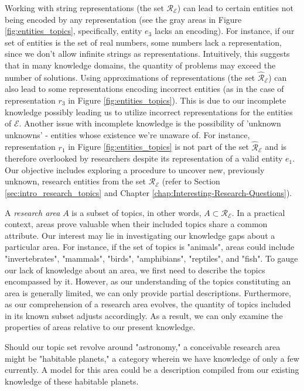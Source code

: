 Working with string representations (the set $\mathcal{R}_\mathcal{E}$) can lead to certain entities not being encoded by any representation (see the gray areas in Figure \ref{fig:entities_topics}, specifically, entity $e_3$ lacks an encoding). For instance, if our set of entities is the set of real numbers, some numbers lack a representation, since we don't allow infinite strings as representations. Intuitively, this suggests that in many knowledge domains, the quantity of problems may exceed the number of solutions. Using approximations of representations (the set $\hat{\mathcal{R}}_\mathcal{E}$) can also lead to some representations encoding incorrect entities (as in the case of representation $r_3$ in Figure \ref{fig:entities_topics}). This is due to our incomplete knowledge possibly leading us to utilize incorrect representations for the entities of $\mathcal{E}$. Another issue with incomplete knowledge is the possibility of 'unknown unknowns' - entities whose existence we're unaware of. For instance, representation $r_1$ in Figure \ref{fig:entities_topics} is not part of the set $\hat{\mathcal{R}}_\mathcal{E}$ and is therefore overlooked by researchers despite its representation of a valid entity $e_1$. Our objective includes exploring a procedure to uncover new, previously unknown, research entities from the set $\mathcal{R}_\mathcal{E}$ (refer to Section \ref{sec:intro_research_topics} and Chapter \ref{chap:Interesting-Research-Questions}).

A \emph{research area} $A$ is a subset of topics, in other words, $A \subset \mathcal{R}_\mathcal{E}$. In a practical context, areas prove valuable when their included topics share a common attribute. Our interest may lie in investigating our knowledge gaps about a particular area. For instance, if the set of topics is "animals", areas could include "invertebrates", "mammals", "birds", "amphibians", "reptiles", and "fish". To gauge our lack of knowledge about an area, we first need to describe the topics encompassed by it. However, as our understanding of the topics constituting an area is generally limited, we can only provide partial descriptions. Furthermore, as our comprehension of a research area evolves, the quantity of topics included in its known subset adjusts accordingly. As a result, we can only examine the properties of areas relative to our present knowledge.

\begin{example}
Should our topic set revolve around "astronomy," a conceivable research area might be "habitable planets," a category wherein we have knowledge of only a few currently. A model for this area could be a description compiled from our existing knowledge of these habitable planets.
\end{example}

